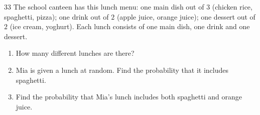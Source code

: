 \begin{probbox}{33}{\relax}
The school canteen has this lunch menu: one main dish out of $3$ (chicken rice, spaghetti, pizza); one drink out of $2$ (apple juice, orange juice); one dessert out of $2$ (ice cream, yoghurt). Each lunch consists of one main dish, one drink and one dessert.
\begin{enumerate}[label=\alph*),leftmargin=1.5em,itemsep=0pt,topsep=2pt]
\item How many different lunches are there?
\item Mia is given a lunch at random. Find the probability that it includes spaghetti.
\item Find the probability that Mia's lunch includes both spaghetti and orange juice.
\end{enumerate}
\end{probbox}
